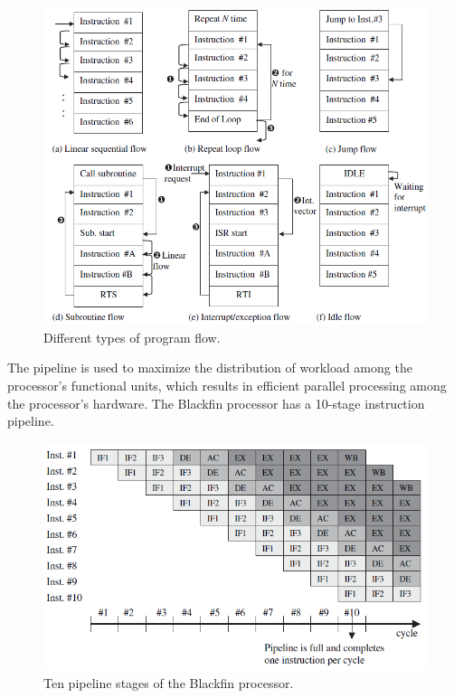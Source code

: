 \begin{figure} [H]
	\centering
	\includegraphics[width=\linewidth]{graphics/16.png}
	\caption{Different types of program flow.}
	\label{fig:16}
\end{figure}

The pipeline is used to maximize the distribution of workload among the processor's functional units, which results in efficient parallel processing among the processor's hardware. The Blackfin processor has a 10-stage instruction pipeline. 

\begin{figure} [H]
	\centering
	\includegraphics[width=\linewidth]{graphics/14.png}
	\caption{Ten pipeline stages of the Blackfin processor.}
	\label{fig:14}
\end{figure}

